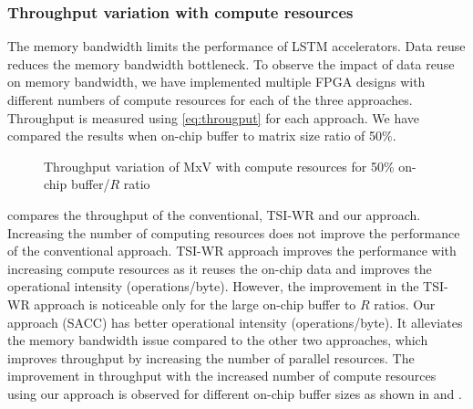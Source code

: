 {{{{\subsubsection{Throughput variation with compute resources}
The memory bandwidth limits the performance of LSTM accelerators. Data reuse reduces the memory bandwidth bottleneck. To observe the impact of data reuse on memory bandwidth, we have implemented multiple FPGA designs with different numbers of compute resources for each of the three approaches. Throughput is measured using \eqref{eq:througput} for each approach. We have compared the results when on-chip buffer to matrix size ratio of 50\%. 
\begin{figure}[htb!]
	\centering
	\hspace{2.0em}
	\caption{Throughput variation of MxV with compute resources for 50\% on-chip buffer/$R$ ratio}	\label{fig:throughputVsPF}
\end{figure}

 compares the throughput of the conventional, TSI-WR and our approach. 
Increasing the number of computing resources does not improve the performance of the conventional approach. TSI-WR approach improves the performance with increasing compute resources as it reuses the on-chip data and improves the operational intensity (operations/byte). However, the improvement in the TSI-WR approach is noticeable only for the large on-chip buffer to $R$ ratios. Our approach (SACC) has better operational intensity (operations/byte). It alleviates the memory bandwidth issue compared to the other two approaches, which improves throughput by increasing the number of parallel resources. The improvement in throughput with the increased number of compute resources using our approach is observed for different on-chip buffer sizes as shown in  and .
}}}}
